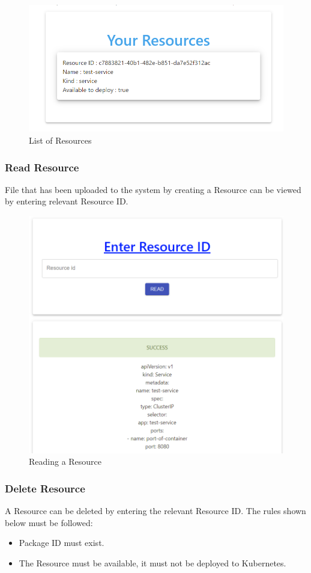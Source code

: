\begin{figure}[H]
	\centering
	\includegraphics[width=130mm]{images/your-resource-1.png}
	\caption{List of Resources}
	\label{ssec:list-of-resources}
\end{figure}

\subsubsection{Read Resource}
File that has been uploaded to the system by creating a Resource can be viewed by entering relevant Resource ID. 

\begin{figure}[H]
	\centering
	\includegraphics[width=120mm]{images/read-resource.png}
	\caption{Reading a Resource}
	\label{ssec:reading-a-resource}
\end{figure}

\subsubsection{Delete Resource}
A Resource can be deleted by entering the relevant Resource ID. The rules shown below must be followed:
\begin{itemize}
  \item Package ID must exist.
  \item The Resource must be available, it must not be deployed to Kubernetes.
\end{itemize}


